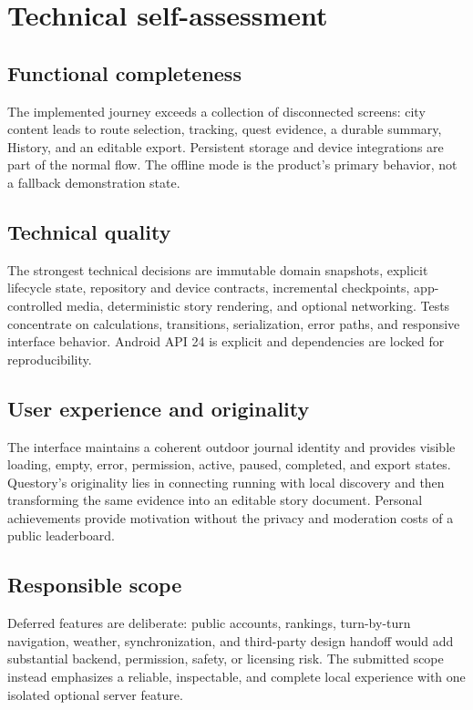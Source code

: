 \section{Technical self-assessment}



\subsection{Functional completeness}
The implemented journey exceeds a collection of disconnected screens: city
content leads to route selection, tracking, quest evidence, a durable summary,
History, and an editable export. Persistent storage and device integrations are
part of the normal flow. The offline mode is the product's primary behavior, not
a fallback demonstration state.

\subsection{Technical quality}
The strongest technical decisions are immutable domain snapshots, explicit
lifecycle state, repository and device contracts, incremental checkpoints,
app-controlled media, deterministic story rendering, and optional networking.
Tests concentrate on calculations, transitions, serialization, error paths, and
responsive interface behavior. Android API 24 is explicit and dependencies are
locked for reproducibility.

\subsection{User experience and originality}
The interface maintains a coherent outdoor journal identity and provides visible
loading, empty, error, permission, active, paused, completed, and export states.
Questory's originality lies in connecting running with local discovery and then
transforming the same evidence into an editable story document. Personal
achievements provide motivation without the privacy and moderation costs of a
public leaderboard.

\subsection{Responsible scope}
Deferred features are deliberate: public accounts, rankings, turn-by-turn
navigation, weather, synchronization, and third-party design handoff would add
substantial backend, permission, safety, or licensing risk. The submitted scope
instead emphasizes a reliable, inspectable, and complete local experience with
one isolated optional server feature.

